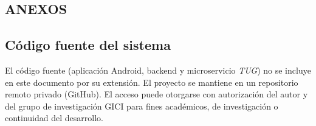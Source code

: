 \documentclass[12pt]{report}
\begin{document}
\begin{justify}


    \appendix
    \clearpage
    \chapter{ANEXOS}
    \label{ch:anexos}

    \section{Código fuente del sistema}

    El código fuente (aplicación Android, backend y microservicio \textit{TUG}) no se incluye en este documento por su extensión. El proyecto se mantiene en un repositorio remoto privado (GitHub). El acceso puede otorgarse con autorización del autor y del grupo de investigación GICI para fines académicos, de investigación o continuidad del desarrollo.



\end{justify}
\end{document}
